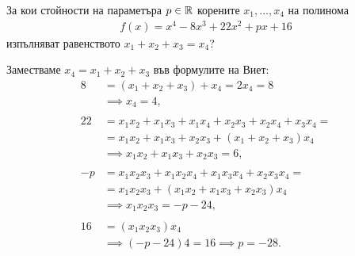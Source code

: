 \documentclass[numbers=endperiod, bibliography=totocnumbered]{scrartcl}
\begin{document}
\begin{exercise}
  За кои стойности на параметъра \( p \in \mathbb{R} \) корените \( x_1, \ldots, x_4 \) на полинома
  \begin{align*}
    f(x) = x^4 - 8x^3 + 22x^2 + px + 16
  \end{align*}
  изпълняват равенството \( x_1 + x_2 + x_3 = x_4 \)?
\end{exercise}
\begin{solution}
  Заместваме \( x_4 = x_1 + x_2 + x_3 \) във формулите на Виет:
  \begin{align*}
    8 &= (x_1 + x_2 + x_3) + x_4 = 2x_4 = 8
    \\&\implies
    x_4 = 4,
    \\ \\
    22 &= x_1 x_2 + x_1 x_3 + x_1 x_4 + x_2 x_3 + x_2 x_4 + x_3 x_4 = \\ &= x_1 x_2 + x_1 x_3 + x_2 x_3 + (x_1 + x_2 + x_3) x_4
    \\&\implies
    x_1 x_2 + x_1 x_3 + x_2 x_3 = 6,
    \\ \\
    -p &= x_1 x_2 x_3 + x_1 x_2 x_4 + x_1 x_3 x_4 + x_2 x_3 x_4 = \\ &= x_1 x_2 x_3 + (x_1 x_2 + x_1 x_3 + x_2 x_3) x_4 \\&\implies
    x_1 x_2 x_3 = -p - 24,
    \\ \\
    16 &= (x_1 x_2 x_3) x_4
    \\&\implies
    (-p - 24) 4 = 16 \implies p = -28.
  \end{align*}
\end{solution}

\printbibliography
\end{document}

